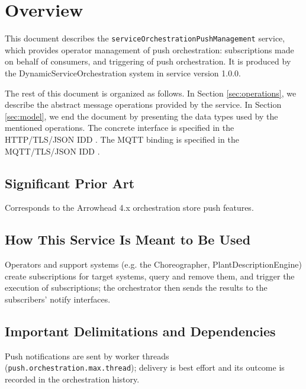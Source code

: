 \documentclass[a4paper]{arrowhead}
\begin{document}
\section{Overview}
\label{sec:overview}

This document describes the \texttt{service\allowbreak{}Orchestration\allowbreak{}Push\allowbreak{}Management} service, which provides operator management of push orchestration: subscriptions made on behalf of consumers, and triggering of push orchestration.
It is produced by the DynamicServiceOrchestration system \cite{dso-sysd} in service version 1.0.0.

The rest of this document is organized as follows.
In Section \ref{sec:operations}, we describe the abstract message operations provided by the service.
In Section \ref{sec:model}, we end the document by presenting the data types used by the mentioned operations.
The concrete interface is specified in the HTTP/TLS/JSON IDD \cite{dso-serviceOrchestrationPushManagement-http-idd}. The MQTT binding is specified in the MQTT/TLS/JSON IDD \cite{dso-serviceOrchestrationPushManagement-mqtt-idd}.

\subsection{Significant Prior Art}

Corresponds to the Arrowhead 4.x orchestration store push features.

\subsection{How This Service Is Meant to Be Used}

Operators and support systems (e.g. the Choreographer, Plant\allowbreak{}Description\allowbreak{}Engine) create subscriptions for target systems, query and remove them, and trigger the execution of subscriptions; the orchestrator then sends the results to the subscribers' notify interfaces.

\subsection{Important Delimitations and Dependencies}
\label{sec:delimitations}

Push notifications are sent by worker threads (\texttt{push.\allowbreak{}orchestration.\allowbreak{}max.\allowbreak{}thread}); delivery is best effort and its outcome is recorded in the orchestration history.
\end{document}
